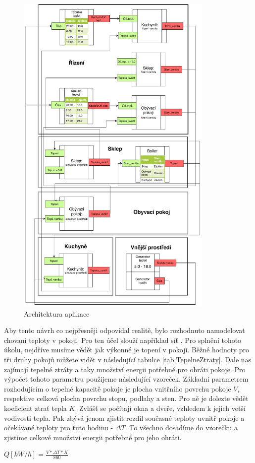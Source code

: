 \begin{figure}[htb]
  \centering
  \includegraphics[width=0.85\textwidth]{obrazky-figures/boiler-net.pdf}
  \caption{Architektura aplikace}
  \label{boiler-net}
\end{figure}

Aby tento návrh co nejpřesněji odpovídal realitě, bylo rozhodnuto namodelovat chovaní teploty v pokoji. Pro ten účel slouží například síť .
Pro splnění tohoto úkolu, nejdříve musíme vědět jak výkonné je topení v pokoji. Běžné hodnoty pro tři druhy pokojů můžete vidět v následující tabulce \ref{tab:TepelneZtraty}. Dale nas zajímají tepelné ztráty a taky množství energii potřebné pro ohráti pokoje. Pro výpočet tohoto parametru použijeme následující vzoreček. Základní parametrem rozhodujícím o tepelné kapacitě pokoje je plocha vnitřního povrchu pokoje $V$, respektive celková plocha povrchu stopu, podlahy a sten. Pro ně je dolezte vědět koeficient ztrať tepla $K$. Zvlášť se počítají okna a dveře, vzhledem k jejich vetší vodivosti tepla. Pak zbývá jenom zjistit rozdíl současné teploty uvnitř pokoje a očekávané teploty pro tuto hodinu - $\Delta{T}$. To všechno dosadíme do vzorečku a zjistíme celkové množství energii potřebné pro jeho ohráti. \cite{tep_calc}
\begin{center}
  $Q[kW/h] = \frac{V*\Delta{T}*K}{860}$
\end{center}

